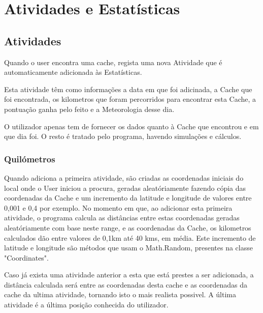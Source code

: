 \documentclass{article}
\begin{document}
\section{Atividades e Estatísticas}

\subsection{Atividades}
\quad Quando o user encontra uma cache, regista uma nova Atividade que é automaticamente adicionada às Estatísticas.
\par Esta atividade têm como informações a data em que foi adicinada, a Cache que foi encontrada, os kilometros que foram percorridos para encontrar esta Cache, a pontuação ganha pelo feito e a Meteorologia desse dia.
\par O utilizador apenas tem de fornecer os dados quanto à Cache que encontrou e em que dia foi. O resto é tratado pelo programa, havendo simulações e cálculos.

\subsubsection{Quilómetros}
\quad  Quando adiciona a primeira atividade, são criadas as coordenadas iniciais do local onde o User iniciou a procura, geradas aleatóriamente fazendo cópia das coordenadas da Cache e um incremento da latitude e longitude de valores entre 0,001 e 0,4 por exemplo. No momento em que, ao adicionar esta primeira atividade, o programa calcula as distâncias entre estas coordenadas geradas aleatóriamente com base neste range, e as coordenadas da Cache, os kilometros calculados dão entre valores de 0,1km até 40 kms, em média.
Este incremento de latitude e longitude são métodos que usam o Math.Random, presentes na classe "Coordinates".
\par Caso já exista uma atividade anterior a esta que está prestes a ser adicionada, a distância calculada será entre as coordenadas desta cache e as coordenadas da cache da ultima atividade, tornando isto o mais realista possivel. A última atividade é a última posição conhecida do utilizador.
\\
\end{document}
